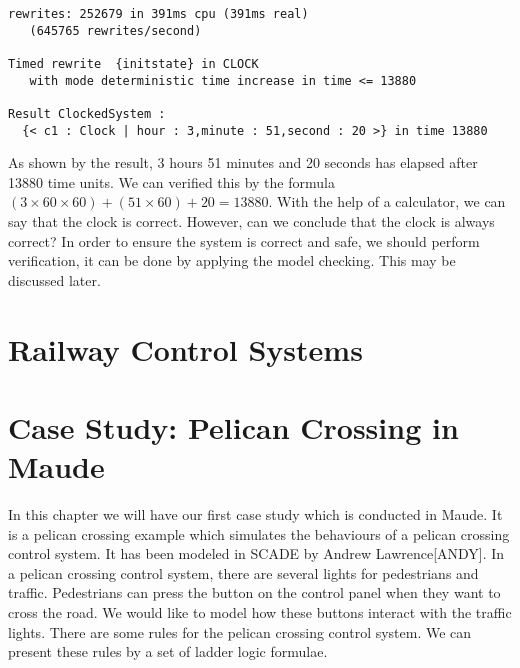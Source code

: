 \documentclass{report}
\begin{document}
\newpage 
\begin{lstlisting}[frame=single,linewidth=14.4cm]
rewrites: 252679 in 391ms cpu (391ms real) 
   (645765 rewrites/second)

Timed rewrite  {initstate} in CLOCK 
   with mode deterministic time increase in time <= 13880

Result ClockedSystem :
  {< c1 : Clock | hour : 3,minute : 51,second : 20 >} in time 13880
\end{lstlisting}
\vspace{0.5cm}
As shown by the result, 3 hours 51 minutes and 20 seconds has elapsed after 13880 time units.
We can verified this by the formula $(3 \times 60 \times 60) + (51 \times 60) + 20 = 13880 $.
With the help of a calculator, we can say that the clock is correct. However, can we conclude that the clock is always correct? In order to ensure the system is correct and safe, we should perform verification, it can be done by applying the model checking. This may be discussed later.

\iffalse \section{LTL Model Checker/search command?}
With the help of a calculator, we can say that the clock is correct. However, can we conclude that the clock is always correct? In order to ensure the system is correct and safe, we should perform verification, it can be done by applying the model checking. This may be discussed later.

We have to verify safety conditions in different real-time operating systems. There

LTL model checker. Model checking can be done with a given time limit. Linear Temporal Logic

Model check

\fi

\newpage
\chapter{Railway Control Systems}

\newpage
\chapter{Case Study: Pelican Crossing in Maude}
In this chapter we will have our first case study which is conducted in Maude. It is a pelican crossing example which simulates the behaviours of a pelican crossing control system. It has been modeled in SCADE by Andrew Lawrence[ANDY]. In a pelican crossing control system, there are several lights for pedestrians and traffic. Pedestrians can press the button on the control panel when they want to cross the road. We would like to model how these buttons interact with the traffic lights. There are some rules for the pelican crossing control system. We can present these rules by a set of ladder logic formulae.
\end{document}
